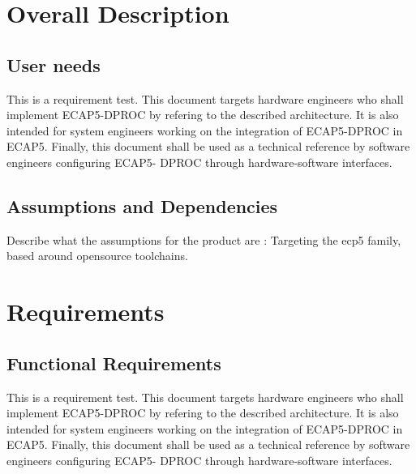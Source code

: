 \section{Overall Description}

\subsection{User needs}

\begin{content}
This is a requirement test.
This document targets hardware engineers who shall implement ECAP5-DPROC by refering to the described architecture. It is also intended for system engineers working on the integration of ECAP5-DPROC in ECAP5. Finally, this document shall be used as a technical reference by software engineers configuring ECAP5- DPROC through hardware-software interfaces.
\end{content}


\subsection{Assumptions and Dependencies}

Describe what the assumptions for the product are : Targeting the ecp5 family, based around opensource toolchains.

\section{Requirements}

\subsection{Functional Requirements}

\begin{content}
This is a requirement test.
This document targets hardware engineers who shall implement ECAP5-DPROC by refering to the described architecture. It is also intended for system engineers working on the integration of ECAP5-DPROC in ECAP5. Finally, this document shall be used as a technical reference by software engineers configuring ECAP5- DPROC through hardware-software interfaces.
\end{content}


